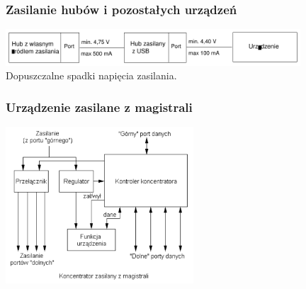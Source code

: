 	\subsubsection{Zasilanie hubów i pozostałych urządzeń}
		\includegraphics[width=11cm]{./wyklady/USB_38_1.pdf}\\
		Dopuszczalne spadki napięcia zasilania.
	\subsubsection{Urządzenie zasilane z magistrali}
		\includegraphics[width=7cm]{./wyklady/USB_39_1.pdf}
